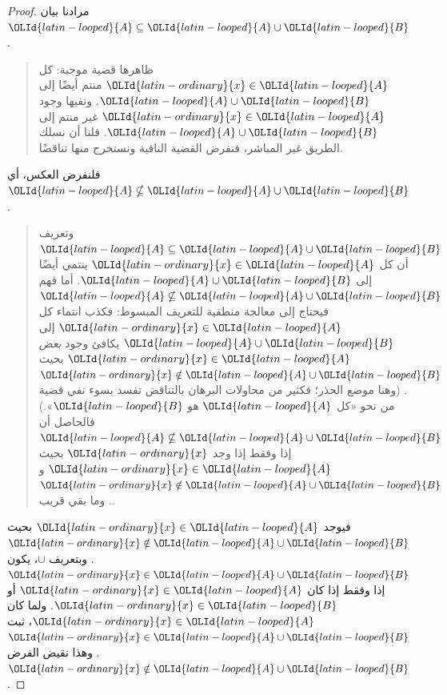 \documentclass[../../../include/open-logic-section]{subfiles}
\begin{document}
\begin{proof}
  مرادنا بيان ${\OLId{latin-looped}{A}} \subseteq {\OLId{latin-looped}{A}} \cup {\OLId{latin-looped}{B}}$.
  \begin{quote}
    ظاهرها قضية موجبة: كل ${\OLId{latin-ordinary}{x}} \in {\OLId{latin-looped}{A}}$ منتم أيضًا إلى ${\OLId{latin-looped}{A}} \cup {\OLId{latin-looped}{B}}$.
    ونفيها وجود ${\OLId{latin-ordinary}{x}} \in {\OLId{latin-looped}{A}}$ غير منتم إلى ${\OLId{latin-looped}{A}} \cup {\OLId{latin-looped}{B}}$. فلنا أن نسلك
    الطريق غير المباشر، فنفرض القضية النافية ونستخرج منها تناقضًا.
    \end{quote}
  فلنفرض العكس، أي ${\OLId{latin-looped}{A}} \nsubseteq {\OLId{latin-looped}{A}} \cup {\OLId{latin-looped}{B}}$.
  \begin{quote}
    وتعريف ${\OLId{latin-looped}{A}} \subseteq {\OLId{latin-looped}{A}} \cup {\OLId{latin-looped}{B}}$ أن كل ${\OLId{latin-ordinary}{x}} \in {\OLId{latin-looped}{A}}$ ينتمي أيضًا إلى
    ${\OLId{latin-looped}{A}} \cup {\OLId{latin-looped}{B}}$. أما فهم ${\OLId{latin-looped}{A}} \nsubseteq {\OLId{latin-looped}{A}} \cup {\OLId{latin-looped}{B}}$ فيحتاج إلى معالجة
    منطقية للتعريف المبسوط: فكذب انتماء كل ${\OLId{latin-ordinary}{x}} \in {\OLId{latin-looped}{A}}$ إلى
    ${\OLId{latin-looped}{A}} \cup {\OLId{latin-looped}{B}}$ يكافئ وجود \emph{بعض} ${\OLId{latin-ordinary}{x}} \in {\OLId{latin-looped}{A}}$ بحيث
    ${\OLId{latin-ordinary}{x}} \notin {\OLId{latin-looped}{A}} \cup {\OLId{latin-looped}{B}}$. (وهنا موضع الحذر؛ فكثير من محاولات البرهان
    بالتناقض تفسد بسوء نفي قضية من نحو «كل ${\OLId{latin-looped}{A}}$ هو ${\OLId{latin-looped}{B}}$».) فالحاصل أن
    ${\OLId{latin-looped}{A}} \nsubseteq {\OLId{latin-looped}{A}} \cup {\OLId{latin-looped}{B}}$ إذا وفقط إذا وجد ${\OLId{latin-ordinary}{x}}$ بحيث ${\OLId{latin-ordinary}{x}} \in {\OLId{latin-looped}{A}}$ و
    ${\OLId{latin-ordinary}{x}} \notin {\OLId{latin-looped}{A}} \cup {\OLId{latin-looped}{B}}$. وما بقي قريب.
  \end{quote}
  فيوجد ${\OLId{latin-ordinary}{x}} \in {\OLId{latin-looped}{A}}$ بحيث ${\OLId{latin-ordinary}{x}} \notin {\OLId{latin-looped}{A}} \cup {\OLId{latin-looped}{B}}$. وبتعريف $\cup$، يكون
  ${\OLId{latin-ordinary}{x}} \in {\OLId{latin-looped}{A}} \cup {\OLId{latin-looped}{B}}$ إذا وفقط إذا كان ${\OLId{latin-ordinary}{x}} \in {\OLId{latin-looped}{A}}$ أو ${\OLId{latin-ordinary}{x}} \in {\OLId{latin-looped}{B}}$.
  ولما كان ${\OLId{latin-ordinary}{x}} \in {\OLId{latin-looped}{A}}$، ثبت ${\OLId{latin-ordinary}{x}} \in {\OLId{latin-looped}{A}} \cup {\OLId{latin-looped}{B}}$. وهذا نقيض الفرض
  ${\OLId{latin-ordinary}{x}} \notin {\OLId{latin-looped}{A}} \cup {\OLId{latin-looped}{B}}$.
\end{proof}
\end{document}

